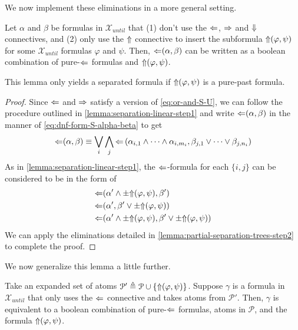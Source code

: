 \documentclass[a4paper,UKenglish,cleveref, autoref, thm-restate, numberwithinsect]{lipics-v2021}
\def\Larrow{\ensuremath\mathord{\Leftarrow}}
\def\Rarrow{\ensuremath\mathord{\Rightarrow}}
\def\Uarrow{\ensuremath\mathord{\Uparrow}}
\def\Darrow{\ensuremath\mathord{\Downarrow}}
\begin{document}
We now implement these eliminations in a more general setting.
\begin{lemma}
    \label{lemma:partial-separation-trees-step3}
    Let $\alpha$ and $\beta$ be formulas in $\mathcal{X}_{until}$ that (1) don't use the $\Larrow$, $\Rarrow$ and $\Darrow$ connectives, and (2) only use the $\Uarrow$ connective to insert the subformula $\Uarrow(\varphi, \psi)$ for some $\mathcal{X}_{until}$ formulas $\varphi$ and $\psi$. Then, $\Larrow(\alpha, \beta)$ can be written as a boolean combination of pure-$\Larrow$ formulas and $\Uarrow(\varphi, \psi)$.
    \begin{remark*}
        This lemma only yields a separated formula if $\Uarrow(\varphi, \psi)$ is a pure-past formula.
    \end{remark*}
\end{lemma}
\begin{proof}
    Since $\Larrow$ and $\Rarrow$ satisfy a version of \eqref{eq:or-and-S-U}, we can follow the procedure outlined in \cref{lemma:separation-linear-step1} and write $\Larrow(\alpha, \beta)$ in the manner of \eqref{eq:dnf-form-S-alpha-beta} to get
    \begin{equation*}
        \Larrow(\alpha, \beta) \equiv \bigvee_i \bigwedge_j \Larrow\left(\alpha_{i, 1} \land \cdots \land \alpha_{i, m_i}, \beta_{j, 1} \lor \cdots \lor \beta_{j, n_i} \right)
    \end{equation*}
    As in \cref{lemma:separation-linear-step1}, the $\Larrow$-formula for each $\{i, j\}$ can be considered to be in the form of
    \begin{equation*}
        \begin{aligned}
            &\Larrow(\alpha' \land \pm \Uarrow(\varphi, \psi), \beta')\\
            &\Larrow(\alpha', \beta' \lor \pm \Uarrow(\varphi, \psi))\\
            &\Larrow(\alpha' \land \pm \Uarrow(\varphi, \psi), \beta' \lor \pm \Uarrow(\varphi, \psi))\\
        \end{aligned}
    \end{equation*}
    We can apply the eliminations detailed in \cref{lemma:partial-separation-trees-step2} to complete the proof.
\end{proof}
We now generalize this lemma a little further.
\begin{lemma}
    \label{lemma:partial-separation-trees-step4}
    Take an expanded set of atoms $\mathcal{P}' \triangleq \mathcal{P} \cup \{\Uarrow(\varphi, \psi)\}$. Suppose $\gamma$ is a formula in $\mathcal{X}_{until}$ that only uses the $\Larrow$ connective and takes atoms from $\mathcal{P}'$. Then, $\gamma$ is equivalent to a boolean combination of pure-$\Larrow$ formulas, atoms in $\mathcal{P}$, and the formula $\Uarrow(\varphi, \psi)$.
\end{lemma}
\end{document}

